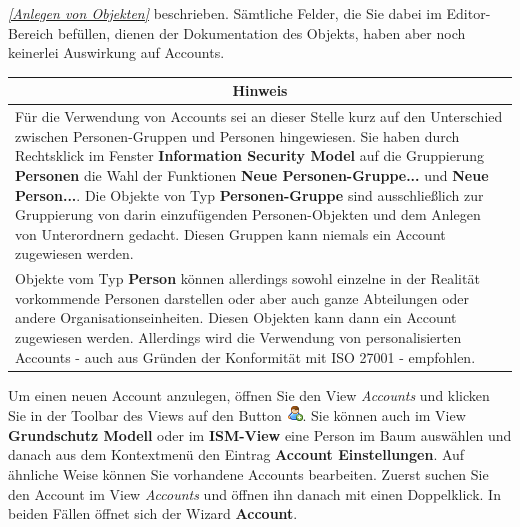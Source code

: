 \documentclass[a4paper,10pt]{book}
\begin{document}
{\em \ref{Anlegen von Objekten} } beschrieben. Sämtliche Felder, die Sie dabei im Editor-Bereich befüllen, dienen der Dokumentation des Objekts, haben aber noch keinerlei Auswirkung auf Accounts.
\newline\\

\begin{longtable}{| p{} |}
\hline
\multicolumn{1}{|c|}{\textbf{Hinweis}} \\
\hline\hline
 Für die Verwendung von Accounts sei an dieser Stelle kurz auf den Unterschied zwischen Personen-Gruppen und Personen hingewiesen. Sie haben
durch Rechtsklick im Fenster \textbf{Information Security Model} auf die Gruppierung \textbf{Personen} die Wahl der Funktionen
\textbf{Neue Personen-Gruppe...} und \textbf{Neue Person...}. Die Objekte von Typ \textbf{Personen-Gruppe} sind ausschließlich
zur Gruppierung von darin einzufügenden Personen-Objekten und dem Anlegen von Unterordnern gedacht. Diesen Gruppen kann niemals
ein Account zugewiesen werden.
\newline\\
Objekte vom Typ \textbf{Person} können allerdings sowohl einzelne in der Realität vorkommende Personen darstellen oder aber auch ganze Abteilungen oder andere Organisationseinheiten. Diesen Objekten kann dann ein Account zugewiesen werden. Allerdings wird die Verwendung von personalisierten Accounts - auch aus Gründen der Konformität mit ISO 27001 - empfohlen. \\[10pt] \hline
\end{longtable}

Um einen neuen Account anzulegen, öffnen Sie den View \textit{Accounts} und
klicken Sie in der Toolbar des Views auf den Button
\includegraphics[height=2ex]{Icon/user_add.png}. Sie können auch im View
\textbf{Grundschutz Modell} oder im \textbf{ISM-View} eine Person im Baum
auswählen und danach aus dem Kontextmenü den Eintrag \textbf{Account
Einstellungen}. Auf ähnliche Weise können Sie vorhandene Accounts bearbeiten.
Zuerst suchen Sie den Account im View \textit{Accounts} und öffnen ihn danach
mit einen Doppelklick. In beiden Fällen öffnet sich der Wizard \textbf{Account}.
\end{document}
